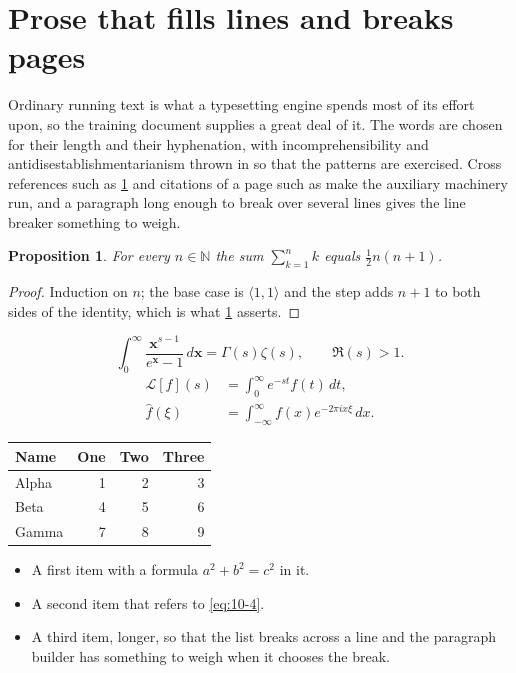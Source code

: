 \documentclass[11pt,a4paper]{report}
\theoremstyle{plain}
\newtheorem{proposition}{Proposition}[chapter]
\newcommand{\vecn}[1]{\mathbf{#1}}
\newcommand{\pairs}[2]{\langle #1,#2\rangle}
\begin{document}
\section{Prose that fills lines and breaks pages}
\label{sec:prose10-4}
Ordinary running text is what a typesetting engine spends most of its effort
upon, so the training document supplies a great deal of it. The words are
chosen for their length and their hyphenation, with incomprehensibility and
antidisestablishmentarianism thrown in so that the patterns are exercised.
Cross references such as \cref{sec:prose10-4} and citations of a page such
as \pageref{sec:prose10-4} make the auxiliary machinery run, and a
paragraph long enough to break over several lines gives the line breaker
something to weigh.
\begin{proposition}\label{prop:10-4}
For every $n\in\mathbb{N}$ the sum $\sum_{k=1}^{n}k$ equals
$\tfrac{1}{2}n(n+1)$.
\end{proposition}
\begin{proof}
Induction on $n$; the base case is $\pairs{1}{1}$ and the step adds $n+1$ to
both sides of the identity, which is what \cref{prop:10-4} asserts.
\end{proof}
\begin{equation}\label{eq:10-4}
  \int_{0}^{\infty}\frac{\vecn{x}^{s-1}}{e^{\vecn{x}}-1}\,d\vecn{x}
    = \Gamma(s)\zeta(s),\qquad \Re(s)>1 .
\end{equation}
\begin{align}
  \mathcal{L}[f](s) &= \int_{0}^{\infty} e^{-st} f(t)\,dt, \\
  \widehat{f}(\xi)  &= \int_{-\infty}^{\infty} f(x) e^{-2\pi i x\xi}\,dx .
\end{align}
\par\noindent\begin{center}
\begin{tabular}{lrrr}
\hline
Name & One & Two & Three \\
\hline
Alpha & 1 & 2 & 3 \\
Beta & 4 & 5 & 6 \\
Gamma & 7 & 8 & 9 \\
\hline
\end{tabular}
\end{center}
\begin{itemize}
  \item A first item with a formula $a^2+b^2=c^2$ in it.
  \item A second item that refers to \eqref{eq:10-4}.
  \item A third item, longer, so that the list breaks across a line and the
    paragraph builder has something to weigh when it chooses the break.
\end{itemize}
\end{document}
